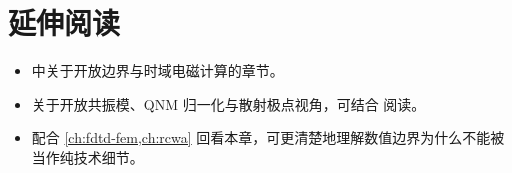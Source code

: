 \section*{延伸阅读}
\begin{itemize}
  \item \cite{taflove2005} 中关于开放边界与时域电磁计算的章节。

  \item 关于开放共振模、QNM 归一化与散射极点视角，可结合 \cite{sauvan2013qnm,kristensen2015qnm,alpeggiani2017qnm} 阅读。

  \item 配合 \cref{ch:fdtd-fem,ch:rcwa} 回看本章，可更清楚地理解数值边界为什么不能被当作纯技术细节。
\end{itemize}


